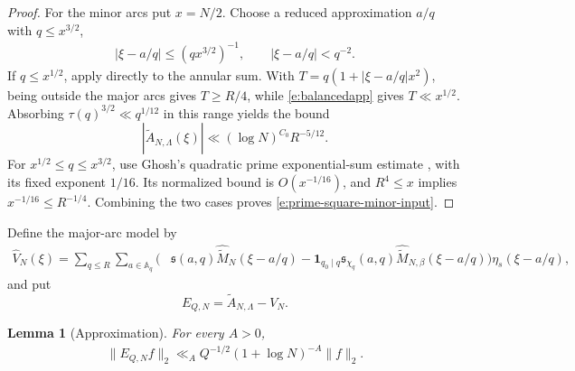 \documentclass[12pt,reqno]{amsart}
\numberwithin{equation}{section}
\newtheorem{lemma}[equation]{Lemma}
\theoremstyle{definition}
\theoremstyle{remark}
\begin{document}
\begin{proof}
For the minor arcs put $x=N/2$. Choose a reduced approximation $a/q$
with $q\leq x^{3/2}$, 
\begin{align}\label{e:balancedapp}
 |\xi-a/q|\leq(qx^{3/2})^{-1},
 \qquad |\xi-a/q|<q^{-2}.
\end{align}
If $q\leq x^{1/2}$, apply \cite[Theorem~1.1]{Xiumin2005}
directly to the annular sum. With $T=q(1+|\xi-a/q|x^2)$, being outside
the major arcs gives $T\geq R/4$, while \eqref{e:balancedapp} gives
$T\ll x^{1/2}$. Absorbing $\tau(q)^{3/2}\ll q^{1/12}$ in this range
yields the bound
\[
 |\widehat{\widetilde A}_{N,\Lambda}(\xi)|
 \ll (\log N)^{C_0}R^{-5/12}.
\]
For $x^{1/2}\leq q\leq x^{3/2}$, use Ghosh's quadratic prime
exponential-sum estimate \cite{Ghosh1981}, with its fixed exponent $1/16$.
Its normalized bound is $O(x^{-1/16})$, and $R^4\leq x$ implies
$x^{-1/16}\leq R^{-1/4}$. Combining the two cases proves
\eqref{e:prime-square-minor-input}.
\end{proof}



Define the major-arc model by
\begin{align}\label{e:VNdef}
 \widehat V_N(\xi)
 =\sum_{q\leq R}\sum_{a\in\mathbb A_q}
 \bigl(
 &\mathfrak s(a,q)\widehat{\widetilde M}_N(\xi-a/q) -\mathbf1_{q_0\mid q}\mathfrak s_{\chi_q}(a,q)
 \widehat{\widetilde M}_{N,\beta}(\xi-a/q)
 \bigr)\eta_s(\xi-a/q),
\end{align}
and put
\[
 E_{Q,N}=\widetilde A_{N,\Lambda}-V_N.
\]


\begin{lemma}[Approximation]\label{l:aaplemma}
For every \(A>0\),
\begin{align}\label{e:aaplemma}
 \|E_{Q,N}f\|_2
 \ll_A Q^{-1/2}(1+\log N)^{-A}\|f\|_2.
\end{align}
\end{lemma}
\end{document}
